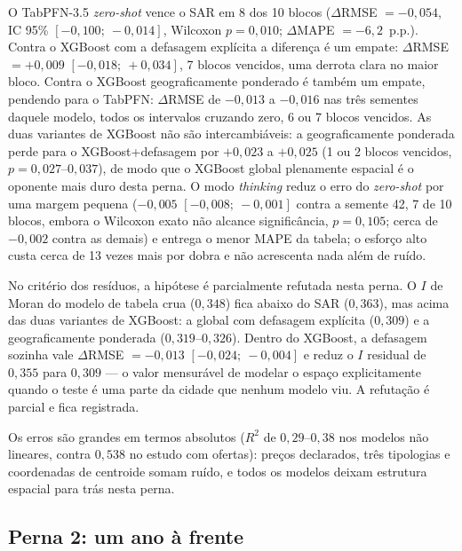 \documentclass[11pt,a4paper]{article}
\begin{document}
O TabPFN-3.5 \emph{zero-shot} vence o SAR em 8 dos 10 blocos ($\Delta$RMSE $= -0{,}054$, IC
95\% $[-0{,}100;\ -0{,}014]$, Wilcoxon $p = 0{,}010$; $\Delta$MAPE $= -6{,}2$~p.p.). Contra o
XGBoost com a defasagem explícita a diferença é um empate: $\Delta$RMSE $= +0{,}009$
$[-0{,}018;\ +0{,}034]$, 7 blocos vencidos, uma derrota clara no maior bloco. Contra o XGBoost
geograficamente ponderado é também um empate, pendendo para o TabPFN: $\Delta$RMSE de
$-0{,}013$ a $-0{,}016$ nas três sementes daquele modelo, todos os intervalos cruzando zero, 6
ou 7 blocos vencidos. As duas variantes de XGBoost não são intercambiáveis: a geograficamente
ponderada perde para o XGBoost+defasagem por $+0{,}023$ a $+0{,}025$ (1 ou 2 blocos vencidos,
$p = 0{,}027$--$0{,}037$), de modo que o XGBoost global plenamente espacial é o oponente mais
duro desta perna. O modo \emph{thinking} reduz o erro do \emph{zero-shot} por uma margem
pequena ($-0{,}005$ $[-0{,}008;\ -0{,}001]$ contra a semente 42, 7 de 10 blocos, embora o
Wilcoxon exato não alcance significância, $p = 0{,}105$; cerca de $-0{,}002$ contra as demais) e
entrega o menor MAPE da tabela; o esforço alto custa cerca de 13 vezes mais por
dobra e não acrescenta nada além de ruído.

No critério dos resíduos, a hipótese é parcialmente refutada nesta perna. O $I$ de Moran do
modelo de tabela crua ($0{,}348$) fica abaixo do SAR ($0{,}363$), mas acima das duas variantes
de XGBoost: a global com defasagem explícita ($0{,}309$) e a geograficamente ponderada
($0{,}319$--$0{,}326$). Dentro do XGBoost, a defasagem sozinha vale $\Delta$RMSE $= -0{,}013$
$[-0{,}024;\ -0{,}004]$ e reduz o $I$ residual de $0{,}355$ para $0{,}309$ --- o valor
mensurável de modelar o espaço explicitamente quando o teste é uma parte da cidade que nenhum
modelo viu. A refutação é parcial e fica registrada.

Os erros são grandes em termos absolutos ($R^2$ de $0{,}29$--$0{,}38$ nos modelos não lineares, contra $0{,}538$ no
estudo com ofertas): preços declarados, três tipologias e coordenadas de centroide somam
ruído, e todos os modelos deixam estrutura espacial para trás nesta perna.

\subsection{Perna 2: um ano à frente}
\end{document}
